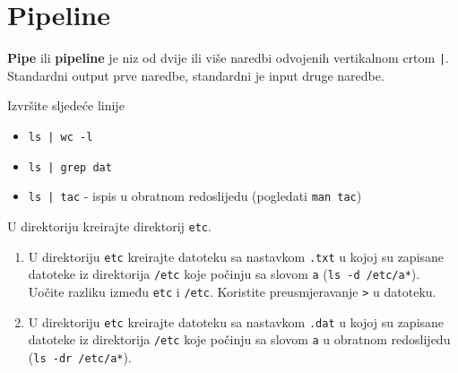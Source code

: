 \section*{Pipeline}

\textbf{Pipe} ili \textbf{pipeline} je niz od dvije ili više naredbi odvojenih vertikalnom crtom \lstinline!|!. Standardni output prve naredbe, standardni je input druge naredbe.

\begin{zadatak} Izvršite sljedeće linije
\begin{itemize}
\item \lstinline!ls | wc -l!
\item \lstinline!ls | grep dat!
\item \lstinline!ls | tac! - ispis u obratnom redoslijedu (pogledati \texttt{man tac})
\end{itemize}
\end{zadatak}
\begin{zadatak} 
U direktoriju kreirajte direktorij \texttt{etc}.

\begin{enumerate}
\item U direktoriju \texttt{etc} kreirajte datoteku sa nastavkom \texttt{.txt} u kojoj su zapisane datoteke iz direktorija \texttt{/etc} koje počinju sa slovom \texttt{a} (\texttt{ls -d /etc/a*}). Uočite razliku između \texttt{etc} i \texttt{/etc}. Koristite preusmjeravanje \texttt{>} u datoteku. 
\item U direktoriju \texttt{etc} kreirajte datoteku sa nastavkom \texttt{.dat} u kojoj su zapisane datoteke iz direktorija \texttt{/etc} koje počinju sa slovom \texttt{a} u obratnom redoslijedu (\texttt{ls -dr /etc/a*}). 
\end{enumerate}
\end{zadatak}


